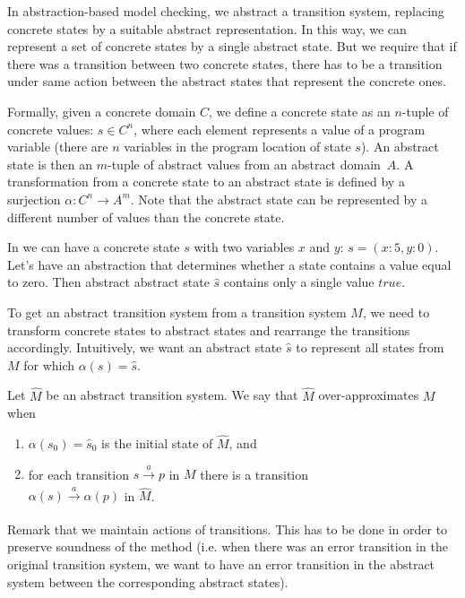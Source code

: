 In abstraction-based model checking, we abstract a transition system, replacing
concrete states by a suitable abstract representation. In this way, we can
represent a set of concrete states by a single abstract state. But we require
that if there was a transition between two concrete states, there has to be a
transition under same action between the abstract states that represent the
concrete ones.

Formally, given a concrete domain $C$, we define a concrete state as an $n$-tuple of concrete values:
$s \in C^n$, where each element represents a value of a program variable (there
are $n$ variables in the program location of state $s$). An abstract state is
then an $m$-tuple of abstract values from an abstract domain~$A$. A
transformation from a concrete state to an abstract state is defined by a
surjection $\alpha \colon C^n \rightarrow A^m$. Note that the abstract state can be
represented by a different number of values than the concrete state.
\begin{example}
In \LLVM we can have a concrete state $s$ with two variables $x$
and $y$: $s = (x:5,y:0)$. Let's have an abstraction that determines whether a state
contains a value equal to zero. Then abstract abstract state $\widehat{s}$ contains only
a single value $true$.
\end{example}

To get an abstract transition system from a transition system $M$, we need to
transform concrete states to abstract states and rearrange the transitions
accordingly. Intuitively, we want an abstract state $\widehat{s}$ to represent
all states from $M$ for which $\alpha(s) = \widehat{s}$.

\begin{definition}\label{def:am}
    Let $\widehat{M}$ be an abstract transition system. We say that $\widehat{M}$
    over-approximates $M$ when
    \begin{enumerate}
        \item $\alpha(s_0) = \widehat{s}_0$ is the initial state of $\widehat{M}$, and
        \item for each transition $s \xrightarrow[]{a} p$ in $M$  there is a
            transition\\$\alpha(s) \xrightarrow[]{a} \alpha(p)$ in $\widehat{M}$.
    \end{enumerate}
\end{definition}
Remark that we maintain actions of transitions. This has to be done in order
to preserve soundness of the method (i.e. when there was an error transition in
the original transition system, we want to have an error transition in the
abstract system between the corresponding abstract states).

